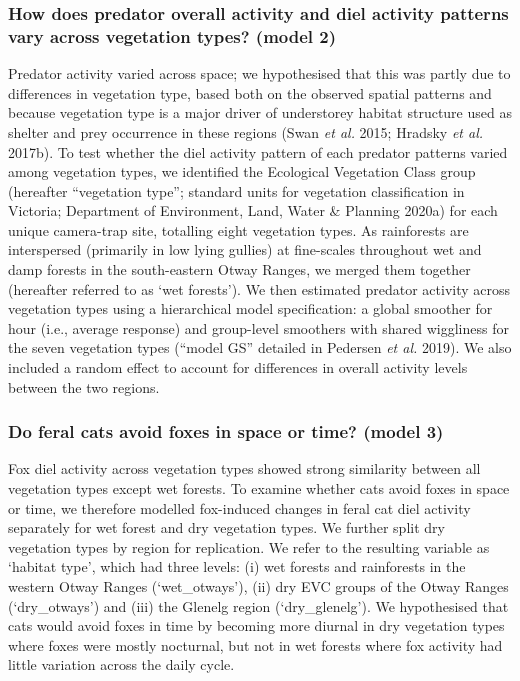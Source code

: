 \documentclass[11pt,a4paper,titlepage,twoside,openright]{style/unimelbthesis}
\begin{document}
\begin{mainmatter}
\hypertarget{how-does-predator-overall-activity-and-diel-activity-patterns-vary-across-vegetation-types-model-2}{%
\subsubsection{How does predator overall activity and diel activity patterns vary across vegetation types? (model 2)}\label{how-does-predator-overall-activity-and-diel-activity-patterns-vary-across-vegetation-types-model-2}}

Predator activity varied across space; we hypothesised that this was partly due to differences in vegetation type, based both on the observed spatial patterns and because vegetation type is a major driver of understorey habitat structure used as shelter and prey occurrence in these regions (Swan \emph{et al.} 2015; Hradsky \emph{et al.} 2017b). To test whether the diel activity pattern of each predator patterns varied among vegetation types, we identified the Ecological Vegetation Class group (hereafter ``vegetation type''; standard units for vegetation classification in Victoria; Department of Environment, Land, Water \& Planning 2020a) for each unique camera-trap site, totalling eight vegetation types. As rainforests are interspersed (primarily in low lying gullies) at fine-scales throughout wet and damp forests in the south-eastern Otway Ranges, we merged them together (hereafter referred to as `wet forests'). We then estimated predator activity across vegetation types using a hierarchical model specification: a global smoother for hour (i.e., average response) and group-level smoothers with shared wiggliness for the seven vegetation types (``model GS'' detailed in Pedersen \emph{et al.} 2019). We also included a random effect to account for differences in overall activity levels between the two regions.

\hypertarget{do-feral-cats-avoid-foxes-in-space-or-time-model-3}{%
\subsubsection{Do feral cats avoid foxes in space or time? (model 3)}\label{do-feral-cats-avoid-foxes-in-space-or-time-model-3}}

Fox diel activity across vegetation types showed strong similarity between all vegetation types except wet forests. To examine whether cats avoid foxes in space or time, we therefore modelled fox-induced changes in feral cat diel activity separately for wet forest and dry vegetation types. We further split dry vegetation types by region for replication. We refer to the resulting variable as `habitat type', which had three levels: (i) wet forests and rainforests in the western Otway Ranges (`wet\_otways'), (ii) dry EVC groups of the Otway Ranges (`dry\_otways') and (iii) the Glenelg region (`dry\_glenelg'). We hypothesised that cats would avoid foxes in time by becoming more diurnal in dry vegetation types where foxes were mostly nocturnal, but not in wet forests where fox activity had little variation across the daily cycle.


\end{mainmatter}
\end{document}
